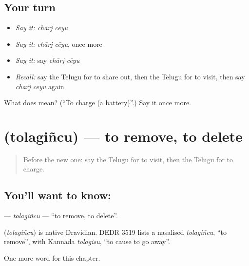 \subsection*{Your turn}
\begin{itemize}
\raggedright
  \item \emph{Say it:} \emph{chārj cēyu}
  \item \emph{Say it:} \emph{chārj cēyu}, once more
  \item \emph{Say it:} say \emph{chārj cēyu}
  \item \emph{Recall:} say the Telugu for to share out, then the Telugu for to visit, then say \emph{chārj cēyu} again
\end{itemize}

\begin{tcolorbox}[breakable,colback=teal!4,colframe=teal!35!black,title={Before you move on}]
What does   mean? (\textquotedblleft{}To charge (a battery)\textquotedblright{}.) Say it once more.
\end{tcolorbox}
\section[\texorpdfstring{\te{తొలగించు} (tolagiñcu)}{తొలగించు (tolagiñcu)}]{ (tolagiñcu) — to remove, to delete}

\label{lesson:TE-C283-tolagincu}



\begin{quote}
Before the new one: say the Telugu for to visit, then the Telugu for to charge.
\end{quote}

\subsection*{You'll want to know: }
\textbf{} — \emph{tolagiñcu} — \textquotedblleft{}to remove, to delete\textquotedblright{}.

\begin{cousinweb}
\textbf{} (\emph{tolagiñcu}) is native Dravidian. DEDR 3519 lists a nasalised \emph{tolagiñcu}, \textquotedblleft{}to remove\textquotedblright{}, with Kannada \emph{tolagisu}, \textquotedblleft{}to cause to go away\textquotedblright{}.
\end{cousinweb}

\begin{grammarlens}[title={What you've built}]
One more word for this chapter.
\end{grammarlens}

